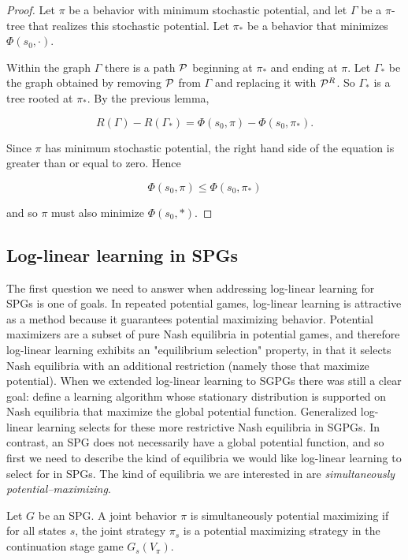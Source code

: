 \begin{proof}
Let $\pi$ be a behavior with minimum stochastic potential, and let $\Gamma$ be a $\pi$-tree that realizes this stochastic potential. Let $\pi_*$ be a behavior that minimizes $\Phi(s_0, \cdot)$.

Within the graph $\Gamma$ there is a path $\mathcal{P}$ beginning at $\pi_*$ and ending at $\pi$. Let $\Gamma_*$ be the graph obtained by removing $\mathcal{P}$ from $\Gamma$ and replacing it with $\mathcal{P}^R$. So $\Gamma_*$ is a tree rooted at $\pi_*$. By the previous lemma,

$$
R(\Gamma) - R(\Gamma_*) = \Phi(s_0, \pi) - \Phi(s_0, \pi_*).
$$

Since $\pi$ has minimum stochastic potential, the right hand side of the equation is greater than or equal to zero. Hence

$$
\Phi(s_0, \pi) \leq \Phi(s_0, \pi_*)
$$

and so $\pi$ must also minimize $\Phi(s_0, *)$.
\end{proof}



\subsection{Log-linear learning in SPGs}


The first question we need to answer when addressing log-linear learning for SPGs is one of goals. In repeated potential games, log-linear learning is attractive as a method because it guarantees potential maximizing behavior. Potential maximizers are a subset of pure Nash equilibria in potential games, and therefore log-linear learning exhibits an "equilibrium selection" property, in that it selects Nash equilibria with an additional restriction (namely those that maximize potential). When we extended log-linear learning to SGPGs there was still a clear goal: define a learning algorithm whose stationary distribution is supported on Nash equilibria that maximize the global potential function. Generalized log-linear learning selects for these more restrictive Nash equilibria in SGPGs. In contrast, an SPG does not necessarily have a global potential function, and so first we need to describe the kind of equilibria we would like log-linear learning to select for in SPGs. The kind of equilibria we are interested in are {\em simultaneously potential--maximizing}.

\begin{mydef}
Let $G$ be an SPG. A joint behavior $\pi$ is simultaneously potential maximizing if for all states $s$, the joint strategy $\pi_s$ is a potential maximizing strategy in the continuation stage game $G_s(V_{\pi})$. 
\end{mydef}

